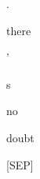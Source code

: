 \documentclass[varwidth=150mm]{standalone}
\begin{document}
\begin{CJK*}{UTF8}{gbsn}
{{{\colorbox{red!0.0}{\strut .} \colorbox{red!0.0}{\strut there} \colorbox{red!0.0}{\strut '} \colorbox{red!2.452352285385132}{\strut s} \colorbox{red!0.0}{\strut no} \colorbox{red!0.0}{\strut doubt} \colorbox{red!5.268886089324951}{\strut [SEP]}
}}}
\end{CJK*}
\end{document}
